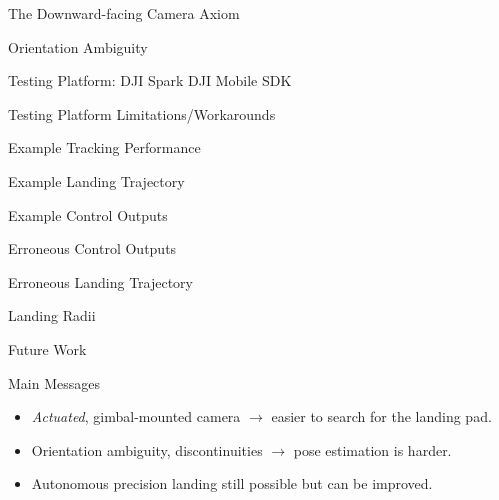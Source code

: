 \documentclass[aspectratio=169]{beamer}
\newif\ifpause
\newcommand{\mypause}{\ifpause \pause \fi}
\begin{document}
\begin{frame}{The Downward-facing Camera Axiom}
\end{frame}

\begin{frame}{Orientation Ambiguity}
\end{frame}

\begin{frame}{Testing Platform: DJI Spark}
	DJI Mobile SDK
\end{frame}

\begin{frame}{Testing Platform Limitations/Workarounds}
\end{frame}

\begin{frame}{Example Tracking Performance}
\end{frame}

\begin{frame}{Example Landing Trajectory}
\end{frame}

\begin{frame}{Example Control Outputs}
\end{frame}

\begin{frame}{Erroneous Control Outputs}
\end{frame}

\begin{frame}{Erroneous Landing Trajectory}
\end{frame}

\begin{frame}{Landing Radii}
\end{frame}

\begin{frame}{Future Work}
\end{frame}

\begin{frame}{Main Messages}
	\begin{itemize}
		\item \emph{Actuated}, gimbal-mounted camera
			\mypause $\rightarrow$ easier to search for the landing pad.
		\mypause\item Orientation ambiguity, discontinuities
			\mypause $\rightarrow$ pose estimation is harder.
		\mypause\item Autonomous precision landing still possible
			\mypause but can be improved.
	\end{itemize}
\end{frame}


\end{document}
